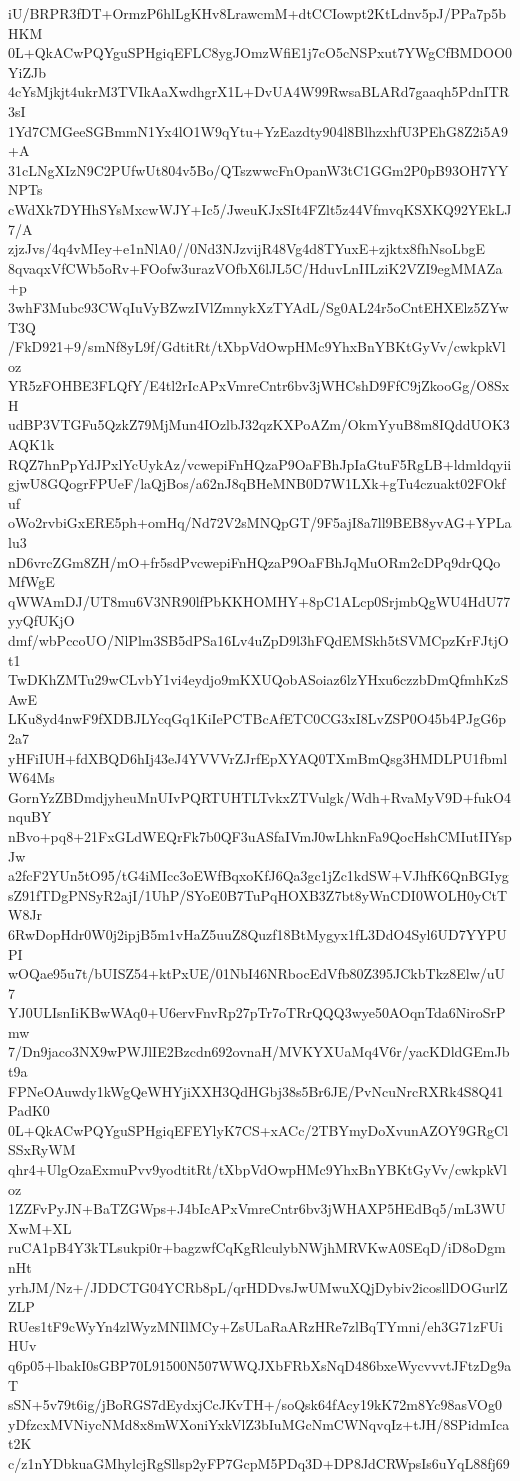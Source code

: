 iU/BRPR3fDT+OrmzP6hlLgKHv8LrawcmM+dtCCIowpt2KtLdnv5pJ/PPa7p5bHKM
0L+QkACwPQYguSPHgiqEFLC8ygJOmzWfiE1j7cO5cNSPxut7YWgCfBMDOO0YiZJb
4cYsMjkjt4ukrM3TVIkAaXwdhgrX1L+DvUA4W99RwsaBLARd7gaaqh5PdnITR3sI
1Yd7CMGeeSGBmmN1Yx4lO1W9qYtu+YzEazdty904l8BlhzxhfU3PEhG8Z2i5A9+A
31cLNgXIzN9C2PUfwUt804v5Bo/QTszwwcFnOpanW3tC1GGm2P0pB93OH7YYNPTs
cWdXk7DYHhSYsMxcwWJY+Ic5/JweuKJxSIt4FZlt5z44VfmvqKSXKQ92YEkLJ7/A
zjzJvs/4q4vMIey+e1nNlA0//0Nd3NJzvijR48Vg4d8TYuxE+zjktx8fhNsoLbgE
8qvaqxVfCWb5oRv+FOofw3urazVOfbX6lJL5C/HduvLnIILziK2VZI9egMMAZa+p
3whF3Mubc93CWqIuVyBZwzIVlZmnykXzTYAdL/Sg0AL24r5oCntEHXElz5ZYwT3Q
/FkD921+9/smNf8yL9f/GdtitRt/tXbpVdOwpHMc9YhxBnYBKtGyVv/cwkpkVloz
YR5zFOHBE3FLQfY/E4tl2rIcAPxVmreCntr6bv3jWHCshD9FfC9jZkooGg/O8SxH
udBP3VTGFu5QzkZ79MjMun4IOzlbJ32qzKXPoAZm/OkmYyuB8m8IQddUOK3AQK1k
RQZ7hnPpYdJPxlYcUykAz/vcwepiFnHQzaP9OaFBhJpIaGtuF5RgLB+ldmldqyii
gjwU8GQogrFPUeF/laQjBos/a62nJ8qBHeMNB0D7W1LXk+gTu4czuakt02FOkfuf
oWo2rvbiGxERE5ph+omHq/Nd72V2sMNQpGT/9F5ajI8a7ll9BEB8yvAG+YPLalu3
nD6vrcZGm8ZH/mO+fr5sdPvcwepiFnHQzaP9OaFBhJqMuORm2cDPq9drQQoMfWgE
qWWAmDJ/UT8mu6V3NR90lfPbKKHOMHY+8pC1ALcp0SrjmbQgWU4HdU77yyQfUKjO
dmf/wbPccoUO/NlPlm3SB5dPSa16Lv4uZpD9l3hFQdEMSkh5tSVMCpzKrFJtjOt1
TwDKhZMTu29wCLvbY1vi4eydjo9mKXUQobASoiaz6lzYHxu6czzbDmQfmhKzSAwE
LKu8yd4nwF9fXDBJLYcqGq1KiIePCTBcAfETC0CG3xI8LvZSP0O45b4PJgG6p2a7
yHFiIUH+fdXBQD6hIj43eJ4YVVVrZJrfEpXYAQ0TXmBmQsg3HMDLPU1fbmlW64Ms
GornYzZBDmdjyheuMnUIvPQRTUHTLTvkxZTVulgk/Wdh+RvaMyV9D+fukO4nquBY
nBvo+pq8+21FxGLdWEQrFk7b0QF3uASfaIVmJ0wLhknFa9QocHshCMIutIIYspJw
a2fcF2YUn5tO95/tG4iMIcc3oEWfBqxoKfJ6Qa3gc1jZc1kdSW+VJhfK6QnBGIyg
sZ91fTDgPNSyR2ajI/1UhP/SYoE0B7TuPqHOXB3Z7bt8yWnCDI0WOLH0yCtTW8Jr
6RwDopHdr0W0j2ipjB5m1vHaZ5uuZ8Quzf18BtMygyx1fL3DdO4Syl6UD7YYPUPI
wOQae95u7t/bUISZ54+ktPxUE/01NbI46NRbocEdVfb80Z395JCkbTkz8Elw/uU7
YJ0ULIsnIiKBwWAq0+U6ervFnvRp27pTr7oTRrQQQ3wye50AOqnTda6NiroSrPmw
7/Dn9jaco3NX9wPWJlIE2Bzcdn692ovnaH/MVKYXUaMq4V6r/yacKDldGEmJbt9a
FPNeOAuwdy1kWgQeWHYjiXXH3QdHGbj38s5Br6JE/PvNcuNrcRXRk4S8Q41PadK0
0L+QkACwPQYguSPHgiqEFEYlyK7CS+xACc/2TBYmyDoXvunAZOY9GRgClSSxRyWM
qhr4+UlgOzaExmuPvv9yodtitRt/tXbpVdOwpHMc9YhxBnYBKtGyVv/cwkpkVloz
1ZZFvPyJN+BaTZGWps+J4bIcAPxVmreCntr6bv3jWHAXP5HEdBq5/mL3WUXwM+XL
ruCA1pB4Y3kTLsukpi0r+bagzwfCqKgRlculybNWjhMRVKwA0SEqD/iD8oDgmnHt
yrhJM/Nz+/JDDCTG04YCRb8pL/qrHDDvsJwUMwuXQjDybiv2icosllDOGurlZZLP
RUes1tF9cWyYn4zlWyzMNIlMCy+ZsULaRaARzHRe7zlBqTYmni/eh3G71zFUiHUv
q6p05+lbakI0sGBP70L91500N507WWQJXbFRbXsNqD486bxeWycvvvtJFtzDg9aT
sSN+5v79t6ig/jBoRGS7dEydxjCcJKvTH+/soQsk64fAcy19kK72m8Yc98asVOg0
yDfzcxMVNiycNMd8x8mWXoniYxkVlZ3bIuMGcNmCWNqvqIz+tJH/8SPidmIcat2K
c/z1nYDbkuaGMhylcjRgSllsp2yFP7GcpM5PDq3D+DP8JdCRWpsIs6uYqL88fj69
